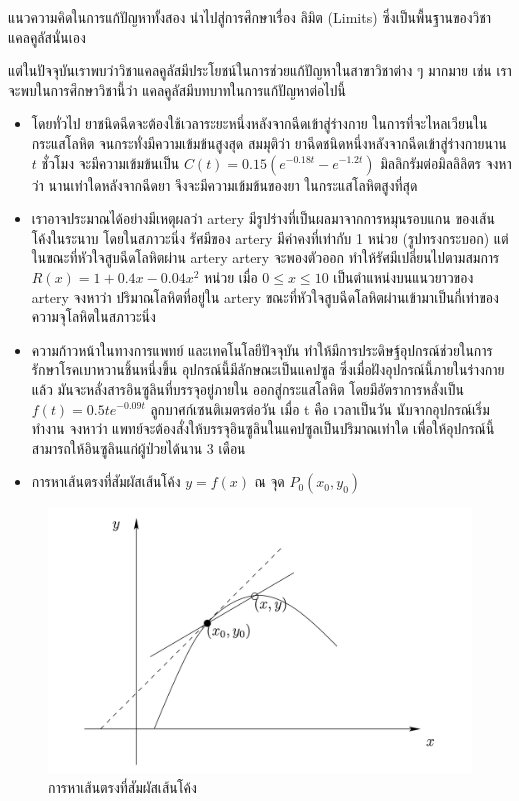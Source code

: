 \documentclass[
]{book}
\theoremstyle{definition}
\theoremstyle{definition}
\theoremstyle{definition}
\theoremstyle{definition}
\theoremstyle{remark}
\begin{document}
แนวความคิดในการแก้ปัญหาทั้งสอง นำไปสู่การศึกษาเรื่อง ลิมิต (Limits)
ซึ่งเป็นพื้นฐานของวิชาแคลคูลัสนั่นเอง

แต่ในปัจจุบันเราพบว่าวิชาแคลคูลัสมีประโยชน์ในการช่วยแก้ปัญหาในสาขาวิชาต่าง ๆ มากมาย เช่น
เราจะพบในการศึกษาวิชานี้ว่า แคลคูลัสมีบทบาทในการแก้ปัญหาต่อไปนี้

\begin{itemize}
\item
  โดยทั่วไป ยาชนิดฉีดจะต้องใช้เวลาระยะหนึ่งหลังจากฉีดเข้าสู่ร่างกาย
  ในการที่จะไหลเวียนในกระแสโลหิต จนกระทั่งมีความเข้มข้นสูงสุด สมมุติว่า
  ยาฉีดชนิดหนึ่งหลังจากฉีดเข้าสู่ร่างกายนาน \(t\) ชั่วโมง จะมีความเข้มข้นเป็น
  \(C(t) = 0.15(e^{-0.18t}-e^{-1.2t})\) มิลลิกรัมต่อมิลลิลิตร จงหาว่า
  นานเท่าใดหลังจากฉีดยา จึงจะมีความเข้มข้นของยา ในกระแสโลหิตสูงที่สุด
\item
  เราอาจประมาณได้อย่างมีเหตุผลว่า artery มีรูปร่างที่เป็นผลมาจากการหมุนรอบแกน
  ของเส้นโค้งในระนาบ โดยในสภาวะนิ่ง รัศมีของ artery มีค่าคงที่เท่ากับ 1 หน่วย
  (รูปทรงกระบอก) แต่ในขณะที่หัวใจสูบฉีดโลหิตผ่าน artery artery จะพองตัวออก
  ทำให้รัศมีเปลี่ยนไปตามสมการ \(R(x) = 1+0.4x-0.04x^{2}\) หน่วย เมื่อ
  \(0 \leq x\leq 10\) เป็นตำแหน่งบนแนวยาวของ artery จงหาว่า ปริมาณโลหิตที่อยู่ใน
  artery ขณะที่หัวใจสูบฉีดโลหิตผ่านเข้ามาเป็นกี่เท่าของความจุโลหิตในสภาวะนิ่ง
\item
  ความก้าวหน้าในทางการแพทย์ และเทคโนโลยีปัจจุบัน
  ทำให้มีการประดิษฐ์อุปกรณ์ช่วยในการรักษาโรคเบาหวานชิ้นหนึ่งขึ้น
  อุปกรณ์นี้มีลักษณะเป็นแคปซูล ซึ่งเมื่อฝังอุปกรณ์นี้ภายในร่างกายแล้ว
  มันจะหลั่งสารอินซูลินที่บรรจุอยู่ภายใน ออกสู่กระแสโลหิต โดยมีอัตราการหลั่งเป็น
  \(f\left( t\right) =0.5te^{-0.09t}\) ลูกบาศก์เซนติเมตรต่อวัน เมื่อ t คือ
  เวลาเป็นวัน นับจากอุปกรณ์เริ่มทำงาน จงหาว่า
  แพทย์จะต้องสั่งให้บรรจุอินซูลินในแคปซูลเป็นปริมาณเท่าใด
  เพื่อให้อุปกรณ์นี้สามารถให้อินซูลินแก่ผู้ป่วยได้นาน 3 เดือน
\item
  การหาเส้นตรงที่สัมผัสเส้นโค้ง \(y = f(x)\) ณ จุด \(P_{0}(x_{0},y_{0})\)
\end{itemize}

\begin{figure}

{\centering \includegraphics[width=0.5\linewidth]{images/fig-tangent-line} 

}

\caption{การหาเส้นตรงที่สัมผัสเส้นโค้ง}\label{fig:fig-tangent-line}
\end{figure}
\end{document}
